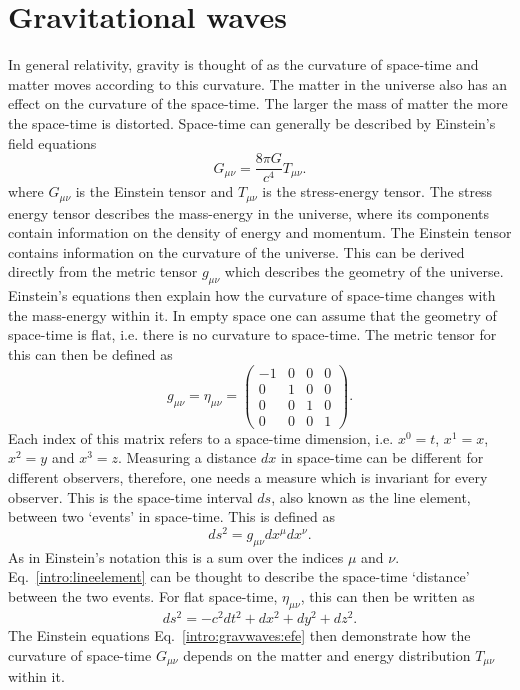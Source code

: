 \section{\label{intro:gravwaves}Gravitational waves}

In general relativity, gravity is thought of as the curvature of space-time and matter moves according to this curvature. 
The matter in the universe also has an effect on the curvature of the space-time.
The larger the mass of matter the more the space-time is distorted.
Space-time can generally be described by Einstein's field equations
\begin{equation}
\label{intro:gravwaves:efe}
    G_{\mu \nu} = \frac{8 \pi G}{c^4}T_{\mu \nu}.
\end{equation}
where $G_{\mu \nu}$ is the Einstein tensor and $T_{\mu \nu}$ is the stress-energy tensor.
The stress energy tensor describes the mass-energy in the universe, where its components contain information on the density of energy and momentum.
The Einstein tensor contains information on the curvature of the universe. 
This can be derived directly from the metric tensor $g_{\mu \nu}$ which describes the geometry of the universe.
Einstein's equations then explain how the curvature of space-time changes with the mass-energy within it. 
In empty space one can assume that the geometry of space-time is flat, i.e. there is no curvature to space-time. The metric tensor for this can then be defined as
\begin{equation}
g_{\mu \nu} = \eta_{\mu \nu} = \left(
\begin{matrix}
-1 & 0 & 0 & 0 \\
0 & 1 & 0 & 0 \\
0 & 0 & 1 & 0 \\
0 & 0 & 0 & 1 
\end{matrix}
\right).
\end{equation}
Each index of this matrix refers to a space-time dimension, i.e. $x^0 = t$, $x^1=x$, $x^2=y$ and $x^3=z$. 
Measuring a distance $dx$ in space-time can be different for different observers, therefore, one needs a measure which is invariant for every observer. 
This is the space-time interval $ds$, also known as the line element, between two `events' in space-time. 
This is defined as
\begin{equation}
\label{intro:lineelement}
    ds^2 = g_{\mu \nu} dx^{\mu}dx^{\nu}.
\end{equation}
As in Einstein's notation this is a sum over the indices $\mu$ and $\nu$.  
Eq.~\ref{intro:lineelement} can be thought to describe the space-time `distance' between the two events.
For flat space-time, $\eta_{\mu\nu}$, this can then be written as
\begin{equation}
    ds^2 = -c^2 dt^2 + dx^2 + dy^2 + dz^2.
\end{equation}
The Einstein equations Eq.~\ref{intro:gravwaves:efe} then demonstrate how the curvature of space-time $G_{\mu\nu}$ depends on the matter and energy distribution $T_{\mu \nu}$ within it.

